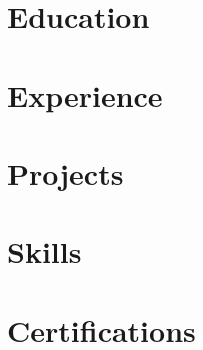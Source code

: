 \documentclass[letterpaper,11pt]{article}
\begin{document}
{}

\section{Education}
\resumeSubHeadingListStart{}
{
  
}
\resumeSubHeadingListEnd{}

\section{Experience}
\resumeSubHeadingListStart{}

{
  
  
  
  
  
  
}

\resumeSubHeadingListEnd{}

\section{Projects}
\resumeSubHeadingListStart{}

{
  
  
  
  
  
  
  
  
  
  
}

\resumeSubHeadingListEnd{}

\section{Skills}
\resumeSubHeadingListStart{}
{
  
  
}
\resumeSubHeadingListEnd{}

\section{Certifications}
\resumeSubHeadingListStart{}
{
  
  
  
  

}
\resumeSubHeadingListEnd{}

\end{document}
